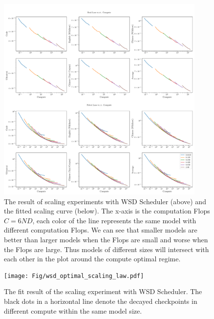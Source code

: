 \begin{figure}[!t]
    \centering
    \includegraphics[width=0.92\textwidth]{Fig/lossvscompute_fitted_and_real.pdf}
    \caption{The result of scaling experiments with WSD Scheduler (above) and the fitted scaling curve (below). The x-axis is the computation Flops $C =6ND$, each color of the line represents the same model with different computation Flops. We can see that smaller models are better than larger models when the Flops are small and worse when the Flops are large. Thus models of different sizes will intersect with each other in the plot around the compute optimal regime.}
    \label{fig:wsd_optimalscalinglaw}
\end{figure}




\begin{figure}[!t]
    \centering
    \texttt{[image: Fig/wsd\_optimal\_scaling\_law.pdf]}
    \caption{The fit result of the scaling experiment with WSD Scheduler. The black dots in a horizontal line denote the decayed checkpoints in different compute within the same model size.}
    \label{fig:wsd_optimalscalinglaw}
\end{figure}

